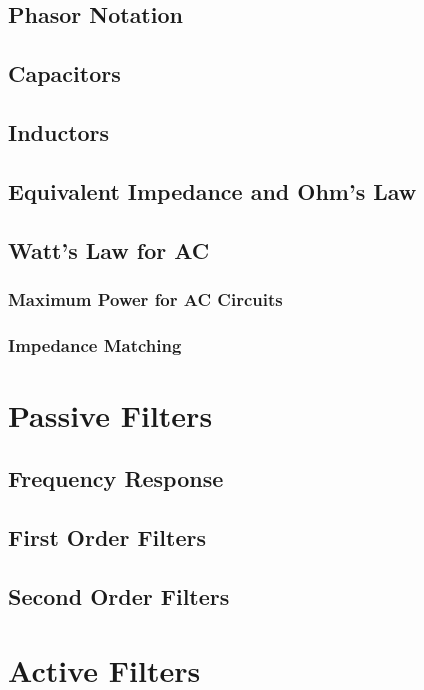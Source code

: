 \documentclass[a4paper,11pt]{book}
\begin{document}
\section{Phasor Notation}

\section{Capacitors}

\section{Inductors}

\section{Equivalent Impedance and Ohm's Law}

\section{Watt's Law for AC}

\subsection*{Maximum Power for AC Circuits}
%
\subsection*{Impedance Matching}
%

\chapter{Passive Filters}
\section{Frequency Response}
\section{First Order Filters}
\section{Second Order Filters}

\chapter{Active Filters}
\end{document}

